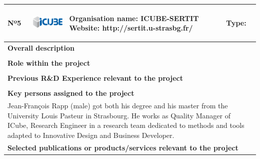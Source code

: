 \begin{longtable}[H]{|p{0.7cm}|p{4cm}|p{7cm}|p{1.3cm}|}
	\hline
	\begin{center} Nº5 \end{center} & \begin{center} \includegraphics[scale=0.6]{./logos/Icube_web} \end{center} & \begin{center} \textbf{Organisation name:} ICUBE-SERTIT \newline \textbf{Website:} http://sertit.u-strasbg.fr/ \end{center} & \begin{center} Type: \end{center} \\ \hline
	
	\multicolumn{4}{|p{13cm}|}{\textbf{Overall description}}  \\ \hline
	
	\multicolumn{4}{|p{14.5cm}|}{}  \\ \hline
	
	\multicolumn{4}{|p{13cm}|}{\textbf{Role within the project}}   \\ \hline
	
	\multicolumn{4}{|p{14.5cm}|}{}  \\ \hline
	
	\multicolumn{4}{|p{13cm}|}{\textbf{Previous R\&D Experience relevant to the project}}  \\ \hline
	
	\multicolumn{4}{|p{14.5cm}|}{}  \\ \hline
	
	\multicolumn{4}{|p{13cm}|}{\textbf{Key persons assigned to the project}}   \\ \hline
	
	\multicolumn{4}{|p{14.5cm}|}{Jean-François Rapp (male) got both his degree and his master from the University Louis Pasteur in Strasbourg. He works as Quality Manager of ICube, Research Engineer in a research team dedicated to methods and tools adapted to Innovative Design and Business Developer.  } \\ \hline
	
	\multicolumn{4}{|p{13cm}|}{\textbf{Selected publications or products/services relevant to the project}}  \\ \hline
	

\end{longtable}
